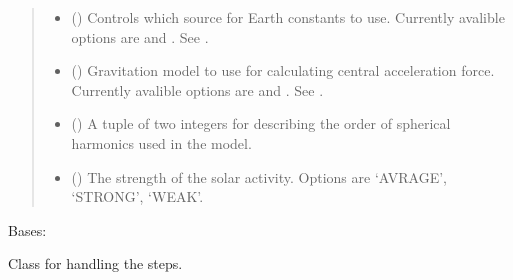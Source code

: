 \documentclass[letterpaper,10pt,english]{sphinxmanual}
\begin{document}
\begin{fulllineitems}
\begin{quote}
\begin{description}
\begin{itemize}
\item {} 
 () \textendash{} 
Controls which source for Earth constants to use. Currently avalible options are  and . See .


\item {} 
 () \textendash{} 
Gravitation model to use for calculating central acceleration force. Currently avalible options are  and . See .


\item {} 
 () \textendash{} 
A tuple of two integers for describing the order of spherical harmonics used in the  model.


\item {} 
 () \textendash{} The strength of the solar activity. Options are ‘AVRAGE’, ‘STRONG’, ‘WEAK’.

\end{itemize}

\end{description}\end{quote}

\begin{fulllineitems}
\label{\detokenize{modules/propagator_orekit:propagator_orekit.PropagatorOrekit.OrekitVariableStep}}
Bases: 

Class for handling the steps.

\begin{fulllineitems}
\label{\detokenize{modules/propagator_orekit:propagator_orekit.PropagatorOrekit.OrekitVariableStep.handleStep}}
\end{fulllineitems}


\end{fulllineitems}
\end{fulllineitems}
\end{document}
